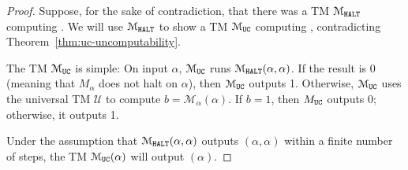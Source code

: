 \begin{proof}

	Suppose, for the sake of contradiction, that there was a TM $\mathcal{M}_{\HALT}$ computing \HALT. We will use $\mathcal{M}_{\HALT}$ to show a TM $\mathcal{M}_{\UC}$ computing \UC, contradicting Theorem~\ref{thm:uc-uncomputability}.

	The TM $\mathcal{M}_{\UC}$ is simple: On input $\alpha$, $\mathcal{M}_{\UC}$ runs $\mathcal{M}_{\HALT}(\alpha, \alpha)$. If the result is 0 (meaning that $M_\alpha$ does not halt on $\alpha$), then $\mathcal{M}_{\UC}$ outputs 1. Otherwise, $\mathcal{M}_{\UC}$ uses the universal TM $\mathcal{U}$ to compute $b = \mathcal{M}_\alpha(\alpha)$. If $b = 1$, then $M_{\UC}$ outputs 0; otherwise, it outputs 1.

	Under the assumption that $\mathcal{M}_{\HALT}(\alpha,\alpha)$ outputs \HALT$(\alpha,\alpha)$ within a finite number of steps, the TM $\mathcal{M}_{\UC}(\alpha)$ will output \UC$(\alpha)$.


\end{proof}

